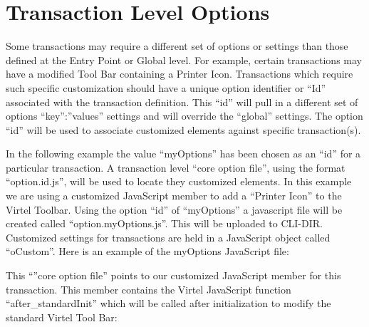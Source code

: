 \documentclass[letterpaper,10pt,english]{sphinxmanual}
\begin{document}
\ignorespaces 

\section{Transaction Level Options}
\label{\detokenize{Customization:transaction-level-options}}\label{\detokenize{Customization:index-5}}
Some transactions may require a different set of options or settings than those defined at the Entry Point or Global level. For example, certain transactions may have a modified Tool Bar containing a Printer Icon. Transactions which require such specific customization should have a unique option identifier or “Id” associated with the transaction definition. This “id” will pull in a different set of options “key”:”values” settings and will override the “global” settings. The option “id” will be used to associate customized elements against specific transaction(s).

In the following example the value “myOptions” has been chosen as an “id” for a particular transaction. A transaction level “core option file”, using the format “option.id.js”, will be used to locate they customized elements. In this example we are using a customized JavaScript member to add a “Printer Icon” to the Virtel Toolbar. Using the option “id” of “myOptions” a javascript file will be created called “option.myOptions.js”. This will be uploaded to CLI-DIR. Customized settings for transactions are held in a JavaScript object called “oCustom”. Here is an example of the myOptions JavaScript file:

\begin{sphinxVerbatim}[commandchars=\\\{\}]
       
 
\end{sphinxVerbatim}


This “”core option file” points to our customized JavaScript member for this transaction. This member contains the Virtel JavaScript function “after\_standardInit” which will be called after initialization to modify the standard Virtel Tool Bar:
\end{document}

